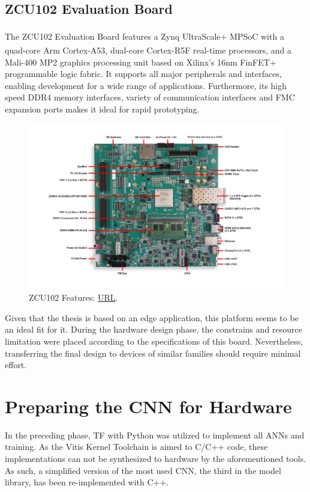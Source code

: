 \subsection{ZCU102 Evaluation Board}
The ZCU102 Evaluation Board features a Zynq\textsuperscript{\textregistered} UltraScale+\texttrademark{} MPSoC with a quad-core Arm\textsuperscript{\textregistered} Cortex\textsuperscript{\textregistered}-A53, dual-core Cortex-R5F real-time processors, and a Mali\texttrademark{}-400 MP2 graphics processing unit based on Xilinx's 16nm FinFET+ programmable logic fabric. It supports all major peripherals and interfaces, enabling development for a wide range of applications. Furthermore, its high speed DDR4 memory interfaces, variety of communication interfaces and FMC expansion ports makes it ideal for rapid prototyping. 

\begin{figure}[H]
    \centering
        \includegraphics[width=1\textwidth]{Images/Hardware/zcu102.jpg}
        \decoRule
        \caption[ZCU102]{ZCU102 Features: \href{https://www.xilinx.com/products/boards-and-kits/ek-u1-zcu102-g.html\#information}{URL}.}
        \label{fig:ZCU102}
\end{figure}

Given that the thesis is based on an edge application, this platform seems to be an ideal fit for it. During the hardware design phase, the constrains and resource limitation were placed according to the specifications of this board. Nevertheless, transferring the final design to devices of similar families should require minimal effort.

\section{Preparing the CNN for Hardware}
In the preceding phase, TF with Python was utilized to implement all ANNs and training. As the Vitis Kernel Toolchain is aimed to C/C++ code, these implementations can not be synthesized to hardware by the aforementioned tools. As such, a simplified version of the most used CNN, the third in the model library, has been re-implemented with C++.

